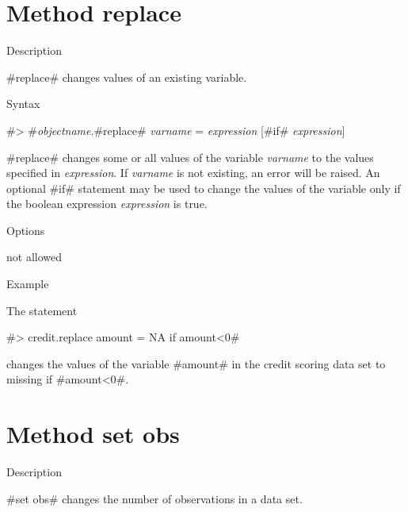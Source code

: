 \clearpage



\section{Method replace}
\label{replace} 



\begin{stanza}{Description}

{#replace# changes values of an existing variable.}
\end{stanza}


\begin{stanza}{Syntax}

 #> #{\em objectname}.#replace# {\em varname} = {\em expression} [#if# {\em expression}]

#replace# changes some or all values of the variable {\em varname}
to the values specified in {\em expression}. If {\em varname} is
not existing, an error will be raised. An optional #if# statement
may be used to change the values of the variable only if the
boolean expression {\em expression} is true.
\end{stanza}


\begin{stanza}{Options}

not allowed
\end{stanza}


\begin{stanza}{Example}

The statement

#> credit.replace amount = NA if amount<0#

changes the values of the variable #amount# in the credit scoring
data set to missing if #amount<0#.
\end{stanza}



\clearpage



\section{Method set obs}
\label{setobs}


\begin{stanza}{Description}

{#set obs# changes the number of observations in a data set.}
\end{stanza}


